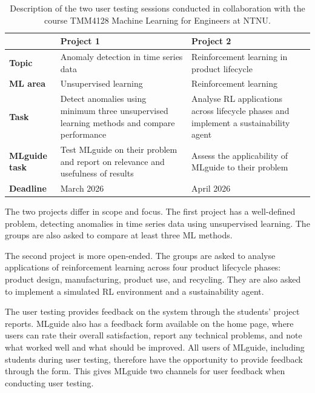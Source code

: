 \begin{table}[H]
\centering
\caption[User testing sessions]{Description of the two user testing sessions conducted in collaboration with the course TMM4128 Machine Learning for Engineers at NTNU.}
\label{tab:user-testing}
\begin{tabular}{l p{5.5cm} p{5.5cm}}
\toprule
 & \textbf{Project 1} & \textbf{Project 2} \\
\midrule
\textbf{Topic} & Anomaly detection in time series data & Reinforcement learning in product lifecycle \\
\addlinespace
\textbf{ML area} & Unsupervised learning & Reinforcement learning \\
\addlinespace
\textbf{Task} & Detect anomalies using minimum three unsupervised learning methods and compare performance & Analyse RL applications across lifecycle phases and implement a sustainability agent \\
\addlinespace
\textbf{MLguide task} & Test MLguide on their problem and report on relevance and usefulness of results & Assess the applicability of MLguide to their problem \\
\addlinespace
\textbf{Deadline} & March 2026 & April 2026 \\
\bottomrule
\end{tabular}
\end{table}

The two projects differ in scope and focus. The first project has a 
well-defined problem, detecting anomalies in time series data using 
unsupervised learning. The groups are also asked to compare at least three 
ML methods.

The second project is more open-ended. The groups are asked to analyse 
applications of reinforcement learning across four product lifecycle phases: 
product design, manufacturing, product use, and recycling. 
They are also asked to implement 
a simulated RL environment and a sustainability agent.

The user testing provides feedback on the system through 
the students' project reports. MLguide also has a feedback form available on 
the home page, where users can rate their overall satisfaction, 
report any technical problems, and note what worked well and what should be improved.
All users of MLguide, including students during user testing, therefore have the opportunity 
to provide feedback through the form.
This gives MLguide two channels for user feedback when conducting user testing.



